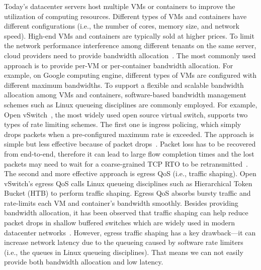 Today's datacenter servers host multiple VMs or containers to improve the utilization 
of computing resources. Different types of VMs and containers have different configurations 
(i.e., the number of cores, memory size, and network speed). High-end VMs and containers 
are typically sold at higher prices. To limit the network performance interference among 
different tenants on the same server, cloud providers need to provide 
bandwidth allocation~\cite{shieh2011sharing,jeyakumar2013eyeq}. 
The most commonly used approach is to provide per-VM or per-container bandwidth allocation. 
For example, on Google computing engine, different types of VMs are configured with different 
maximum bandwidths. To support a flexible and scalable bandwidth allocation among VMs and containers, 
software-based bandwidth management schemes such as Linux queueing disciplines are commonly employed. 
For example, Open vSwitch~\cite{openvswitch}, the most widely used open source virtual switch, supports two 
types of rate limiting schemes. The first one is ingress policing, which simply drops packets when 
a pre-configured maximum rate is exceeded. The approach is simple but less effective because 
of packet drops~\cite{ovs-qos}. 
Packet loss has to be recovered from end-to-end, therefore it can lead to 
large flow completion times and the lost packets may need to wait for a coarse-grained 
TCP RTO to be retransmitted~\cite{dctcp,vasudevan2009safe}. 
The second and more effective approach is egress QoS 
(i.e., traffic shaping). Open vSwitch's egress QoS calls Linux queueing disciplines such as 
Hierarchical Token Bucket (HTB) to perform traffic shaping. Egress QoS absorbs bursty traffic 
and rate-limits each VM and container's bandwidth smoothly. Besides providing bandwidth allocation, 
it has been observed that traffic shaping can help reduce packet drops in shallow buffered switches 
which are widely used in modern datacenter networks~\cite{alizadeh2012less}. However, egress traffic shaping 
has a key drawback---it can increase network latency due to the queueing caused by 
software rate limiters (i.e., the queues in Linux queueing disciplines). 
That means we can not easily provide both bandwidth allocation and low latency.  


